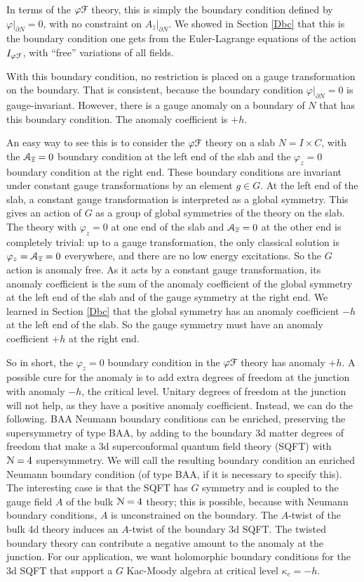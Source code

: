 \documentclass[11pt,a4paper]{article}
\begin{document}
In terms of the $\varphi{\mathcal F}$ theory, this is simply the boundary condition defined by $\varphi|_{\partial N}=0$, with no constraint on $A_{\bar z}|_{\partial N}$.
We showed in Section \ref{Dbc} that this is the boundary condition one gets from the Euler-Lagrange equations of the action $I_{\varphi{\mathcal F}}$, with ``free''
variations of all fields.

With this boundary condition, no restriction is placed on a gauge transformation on the boundary.   That is consistent, because the boundary
condition $\varphi|_{\partial N}=0$ is gauge-invariant.   However, there is a gauge anomaly on a boundary of $N$ that has this boundary condition.
The anomaly coefficient is $+h$.

An easy way to see this is to consider the $\varphi{\mathcal F}$ theory on a slab $N=I\times C$,  with the  ${\mathcal A}_{\overline z}=0$ boundary condition at the left end
of the slab and the $\varphi_z=0$ boundary condition at the right end.   These boundary conditions are invariant under constant gauge transformations
by an element $g\in G$.  At the left end of the slab, a constant gauge transformation is interpreted as a global symmetry.    
This gives an action of $G$ as a group of global symmetries of the theory on the slab.  
 The theory with $\varphi_z=0$
at one end of the slab and ${\mathcal A}_{\overline z}=0$ at the other end is completely trivial: up to a gauge transformation, the only classical solution
is $\varphi_z={\mathcal A}_{\overline z}=0$ everywhere, and there are no low energy excitations.  So the $G$ action is anomaly free. As it acts by a constant gauge
transformation, its anomaly coefficient is the sum of the anomaly coefficient of the global symmetry at the left end of the slab and of the gauge symmetry at the right end.
We learned in Section \ref{Dbc} that the global symmetry has an anomaly coefficient $-h$ at the left end of the slab.  So
the gauge symmetry must have an anomaly coefficient $+h$ at the right end.   

So in short, the $\varphi_z=0$ boundary condition in the $\varphi{\mathcal F}$ theory has anomaly $+h$.
A possible cure for the anomaly is to add extra degrees of freedom at the junction with anomaly $-h$, the critical level.  Unitary degrees of freedom at the junction
will not help, as they have a positive anomaly coefficient.
Instead, we can do the following.   
BAA Neumann boundary conditions can be enriched, preserving the supersymmetry of type BAA, by adding to the boundary
 3d matter degrees of freedom that make a 3d superconformal quantum
 field theory (SQFT) with ${\mathcal N}=4$ supersymmetry. 
  We will call the resulting boundary condition
   an enriched Neumann boundary condition (of type BAA, if it is necessary to specify this).   The interesting case is that the SQFT has
  $G$ symmetry and is coupled to the gauge field $A$ of the bulk ${\cal N}=4$ theory; this is possible, because with  Neumann boundary conditions, $A$
  is unconstrained on the boundary.  
 The $A$-twist of the bulk 4d theory induces an $A$-twist of the  boundary
3d SQFT.   The twisted boundary theory can contribute a negative amount to the anomaly at the junction.  For our application, we want  holomorphic boundary conditions 
for the 3d SQFT that support a $G$ Kac-Moody algebra at critical level $\kappa_c=-h$.
\end{document}
